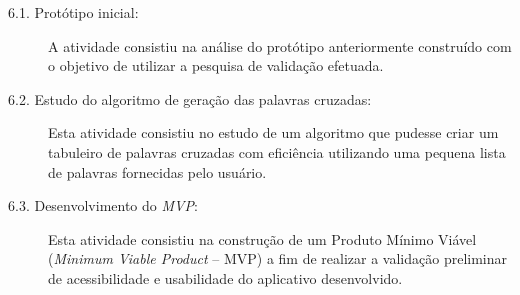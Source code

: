 \begin{description}
\begin{description}
    \item[6.1. Protótipo inicial:]
    A atividade consistiu na análise do protótipo anteriormente construído com o objetivo de utilizar a pesquisa de validação efetuada.
    
    \item[6.2. Estudo do algoritmo de geração das palavras cruzadas:]
    Esta atividade consistiu no estudo de um algoritmo que pudesse criar um tabuleiro de palavras cruzadas com eficiência utilizando uma pequena lista de palavras fornecidas pelo usuário.
    
    \item[6.3. Desenvolvimento do \textit{MVP}:] 
    Esta atividade consistiu na construção de um Produto Mínimo Viável (\textit{Minimum Viable Product} -- MVP) a fim de realizar a validação preliminar de acessibilidade e usabilidade do aplicativo desenvolvido.
\end{description}

\end{description}